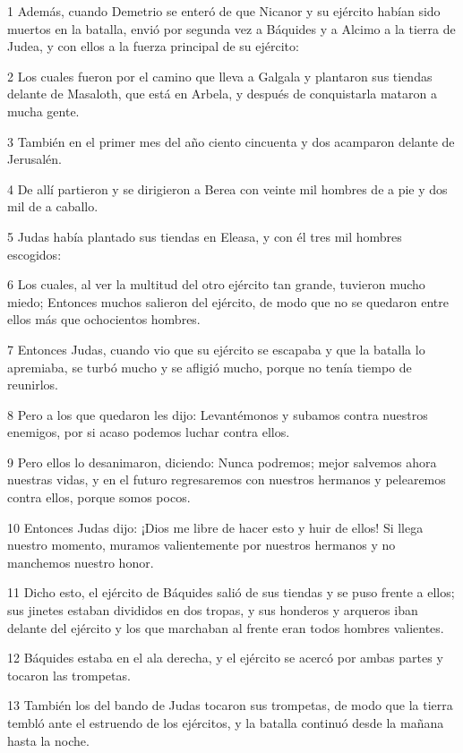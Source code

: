 \par 1 Además, cuando Demetrio se enteró de que Nicanor y su ejército habían sido muertos en la batalla, envió por segunda vez a Báquides y a Alcimo a la tierra de Judea, y con ellos a la fuerza principal de su ejército:
\par 2 Los cuales fueron por el camino que lleva a Galgala y plantaron sus tiendas delante de Masaloth, que está en Arbela, y después de conquistarla mataron a mucha gente.
\par 3 También en el primer mes del año ciento cincuenta y dos acamparon delante de Jerusalén.
\par 4 De allí partieron y se dirigieron a Berea con veinte mil hombres de a pie y dos mil de a caballo.
\par 5 Judas había plantado sus tiendas en Eleasa, y con él tres mil hombres escogidos:
\par 6 Los cuales, al ver la multitud del otro ejército tan grande, tuvieron mucho miedo; Entonces muchos salieron del ejército, de modo que no se quedaron entre ellos más que ochocientos hombres.
\par 7 Entonces Judas, cuando vio que su ejército se escapaba y que la batalla lo apremiaba, se turbó mucho y se afligió mucho, porque no tenía tiempo de reunirlos.
\par 8 Pero a los que quedaron les dijo: Levantémonos y subamos contra nuestros enemigos, por si acaso podemos luchar contra ellos.
\par 9 Pero ellos lo desanimaron, diciendo: Nunca podremos; mejor salvemos ahora nuestras vidas, y en el futuro regresaremos con nuestros hermanos y pelearemos contra ellos, porque somos pocos.
\par 10 Entonces Judas dijo: ¡Dios me libre de hacer esto y huir de ellos! Si llega nuestro momento, muramos valientemente por nuestros hermanos y no manchemos nuestro honor.
\par 11 Dicho esto, el ejército de Báquides salió de sus tiendas y se puso frente a ellos; sus jinetes estaban divididos en dos tropas, y sus honderos y arqueros iban delante del ejército y los que marchaban al frente eran todos hombres valientes.
\par 12 Báquides estaba en el ala derecha, y el ejército se acercó por ambas partes y tocaron las trompetas.
\par 13 También los del bando de Judas tocaron sus trompetas, de modo que la tierra tembló ante el estruendo de los ejércitos, y la batalla continuó desde la mañana hasta la noche.
